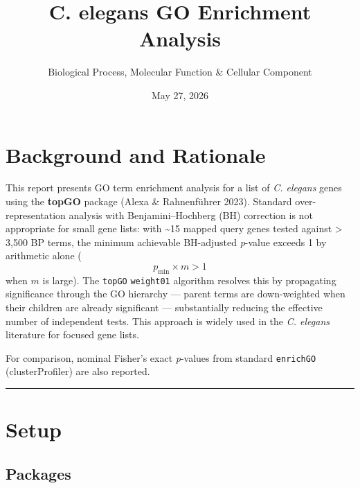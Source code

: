 \documentclass[
  11pt,
]{article}
\title{C. elegans GO Enrichment Analysis}
\subtitle{Biological Process, Molecular Function \& Cellular Component}
\author{}
\date{\vspace{-2.5em}May 27, 2026}
\begin{document}
\maketitle

{
\setcounter{tocdepth}{3}
\tableofcontents
}
\section{Background and Rationale}\label{background-and-rationale}

This report presents GO term enrichment analysis for a list of \emph{C.
elegans} genes using the \textbf{topGO} package (Alexa \& Rahnenführer
2023). Standard over-representation analysis with Benjamini--Hochberg
(BH) correction is not appropriate for small gene lists: with
\textasciitilde15 mapped query genes tested against \textgreater{} 3,500
BP terms, the minimum achievable BH-adjusted \emph{p}-value exceeds 1 by
arithmetic alone (\[p_{\min} \times m > 1\] when \(m\) is large). The
\texttt{topGO} \texttt{weight01} algorithm resolves this by propagating
significance through the GO hierarchy --- parent terms are down-weighted
when their children are already significant --- substantially reducing
the effective number of independent tests. This approach is widely used
in the \emph{C. elegans} literature for focused gene lists.

For comparison, nominal Fisher's exact \emph{p}-values from standard
\texttt{enrichGO} (clusterProfiler) are also reported.

\begin{center}\rule{0.5\linewidth}{0.5pt}\end{center}

\section{Setup}\label{setup}

\subsection{Packages}\label{packages}
\end{document}
